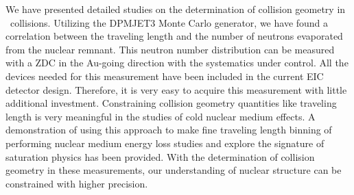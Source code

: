 We have presented detailed studies on the determination of collision geometry
in \eA\ collisions. Utilizing the DPMJET3 Monte Carlo generator, we have found a
correlation between the traveling length and the number of neutrons evaporated
from the nuclear remnant. This neutron number distribution can be measured with
a ZDC in the Au-going direction with the systematics under control. All the
devices needed for this measurement have been included in the current EIC
detector design. Therefore, it is very easy to acquire this measurement
with little additional investment. Constraining collision geometry
quantities like traveling length is very meaningful in the studies of cold
nuclear medium effects. A demonstration of using this approach to make
fine traveling length binning of performing nuclear medium energy loss studies
and explore the signature of saturation physics has been provided. With the
determination of collision geometry in these measurements, our understanding of 
nuclear structure can be constrained with higher precision.


